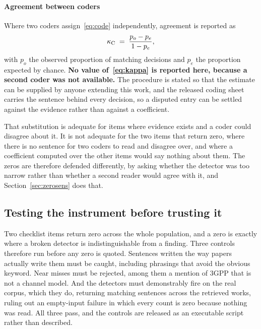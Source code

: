 \documentclass[preprint,11pt,3p]{elsarticle}
\begin{document}
\paragraph{Agreement between coders}
Where two coders assign~\eqref{eq:code} independently, agreement is reported as
\begin{equation}
  \kappa_{\rm C} \;=\; \frac{p_o - p_e}{1 - p_e} ,
  \label{eq:kappa}
\end{equation}
with $p_o$ the observed proportion of matching decisions and $p_e$ the proportion expected by
chance. \textbf{No value of~\eqref{eq:kappa} is reported here, because a second coder was not
available.} The procedure is stated so that the estimate can be supplied by anyone extending this
work, and the released coding sheet carries the sentence behind every decision, so a disputed
entry can be settled against the evidence rather than against a coefficient.

That substitution is adequate for items where evidence exists and a coder could disagree about
it. It is not adequate for the two items that return zero, where there is no sentence for two
coders to read and disagree over, and where a coefficient computed over the other items would
say nothing about them. The zeros are therefore defended differently, by asking whether the
detector was too narrow rather than whether a second reader would agree with it, and
Section~\ref{sec:zerosens} does that.

\subsection{Testing the instrument before trusting it}

Two checklist items return zero across the whole population, and a zero is exactly where a
broken detector is indistinguishable from a finding. Three controls therefore run before any
zero is quoted. Sentences written the way papers actually write them must be caught, including
phrasings that avoid the obvious keyword. Near misses must be rejected, among them a mention of
3GPP that is not a channel model. And the detectors must demonstrably fire on the real corpus,
which they do, returning \numCtrlHits{} matching sentences across the \numCtrlDocs{}
retrieved works, ruling out an empty-input failure in which every count is zero because nothing
was read. All
three pass, and the controls are released as an executable script rather than described.

\end{document}
